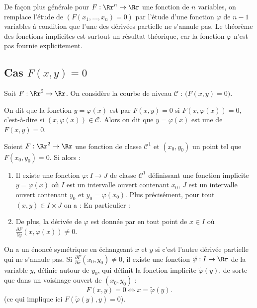 \documentclass[11pt, class=report,crop=false]{standalone}
\begin{document}
\bigskip


De façon plus générale pour $F : \Rr^n \to \Rr$ une fonction de $n$ variables, on remplace l'étude de $(F(x_1,\ldots,x_n)=0)$ par l'étude d'une fonction $\varphi$ de $n-1$ variables à condition que l'une des dérivées partielle ne s'annule pas.
Le théorème des fonctions implicites est surtout un résultat théorique, car la fonction $\varphi$ n'est pas fournie explicitement.



\subsection{Cas $F(x,y) = 0$}

Soit $F : \Rr^2 \to \Rr$. On considère la courbe de niveau 
$\mathcal{C}$ : $\big( F(x,y) = 0 \big)$.

On dit que la fonction $y = \varphi(x)$ est  par $F(x,y) = 0$ si $F(x,\varphi(x)) = 0$, c'est-à-dire si $(x,\varphi(x)) \in \mathcal{C}$.
Alors on dit que $y = \varphi(x)$ est une  de $F(x,y) = 0$.

    
\begin{theoreme}
Soient $F : \Rr^2 \to \Rr$ une fonction de classe $\mathcal{C}^1$ et $(x_0,y_0)$ un point tel que $F(x_0,y_0) = 0$.
Si 
alors :
\begin{enumerate}
    \item Il existe une fonction $\varphi : I \to J$ de classe $\mathcal{C}^1$ définissant une fonction implicite $y = \varphi(x)$ où $I$ est un intervalle ouvert contenant $x_0$, $J$ est un intervalle ouvert contenant $y_0$ et $y_0 = \varphi(x_0)$.
    Plus précisément, pour tout $(x,y) \in I \times J$ on a :
    En particulier : 
    
    
    \item De plus, la dérivée de $\varphi$ est donnée par 
     en tout point de $x \in I$ où $\frac{\partial F}{\partial y}(x,\varphi(x)) \neq 0$.
\end{enumerate}
\end{theoreme}


On a un énoncé symétrique en échangeant $x$ et $y$ si c'est l'autre dérivée partielle qui ne s'annule pas.
Si $\frac{\partial F}{\partial x}(x_0,y_0) \neq 0$, 
il existe une fonction $\tilde\varphi : I \to \Rr$ 
de la variable $y$, définie autour de $y_0$, qui définit la fonction implicite $\tilde\varphi(y)$, de sorte que dans un voisinage ouvert de $(x_0,y_0)$ :
$$F(x,y) = 0 \iff x = \tilde\varphi(y).$$
(ce qui implique ici $F(\tilde\varphi(y),y)=0$).
\end{document}
